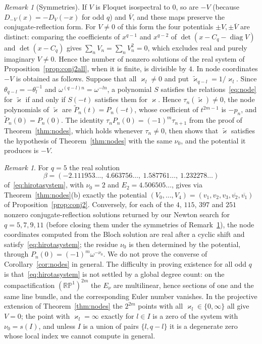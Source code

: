 \documentclass[11pt,reqno]{amsart}
\theoremstyle{definition}
\theoremstyle{remark}
\newtheorem{remark}[theorem]{Remark}
\newcommand{\R}{\mathbb R}
\DeclareMathOperator{\diag}{diag}
\begin{document}
\begin{remark}[Symmetries]\label{rem:nodesym}
If $V$ is Floquet isospectral to $0$, so are $-V$ (because
$D_{-V}(x)=-D_V(-x)$ for odd $q$) and $\overline V$, and these maps preserve the
conjugate-reflection form.  For $V\ne0$ of this form the four potentials
$\pm V,\pm\overline V$ are distinct: comparing the coefficients of $x^{q-1}$ and
$x^{q-2}$ of $\det(x-C_q-\diag V)$ and $\det(x-C_q)$ gives
$\sum_nV_n=\sum_nV_n^2=0$, which excludes real and purely imaginary $V\ne0$.
Hence the number of nonzero solutions of the real system of
Proposition~\ref{prop:conj2all}, when it is finite, is divisible by $4$.  In
node coordinates $-V$ is obtained as follows.  Suppose that all
$\varkappa_l\ne0$ and put $\tilde\varkappa_{q-l}=1/\varkappa_l$.  Since
$\theta_{q-l}=-\theta_l^{-1}$ and $\omega^{(q-l)n}=\omega^{-ln}$, a polynomial
$S$ satisfies the relations~\eqref{eq:node} for $\tilde\varkappa$ if and only
if $S(-t)$ satisfies them for $\varkappa$.  Hence $\tau_n(\tilde\varkappa)\ne0$,
the node polynomials of $\tilde\varkappa$ are $\tilde P_n(t)=P_n(-t)$, whose
coefficient of $t^{2m-1}$ is $-p_n$, and $\tilde P_n(0)=P_n(0)$.  The identity
$\tau_nP_n(0)=(-1)^m\tau_{n+1}$ from the proof of Theorem~\ref{thm:nodes}, which
holds whenever $\tau_n\ne0$, then shows that $\tilde\varkappa$ satisfies the
hypothesis of Theorem~\ref{thm:nodes} with the same $\nu_0$, and the potential
it produces is $-V$.
\end{remark}

\begin{remark}\label{rem:nodesnum}
For $q=5$ the real solution
\[
 \beta=(-2.111953\ldots,\ 4.663756\ldots,\ 1.587761\ldots,\ 1.232278\ldots)
\]
of~\eqref{eq:hirotasystem}, with $\nu_0=2$ and $E_2=4.506505\ldots$, gives
via Theorem~\ref{thm:nodes}(b) exactly the potential
$(V_0,\dots,V_4)=(v_1,v_2,v_3,\overline{v_2},\overline{v_1})$ of
Proposition~\ref{prop:conj2}.  Conversely, for each of the $4$, $115$, $397$
and $251$ nonzero conjugate-reflection solutions returned by our Newton search
for $q=5,7,9,11$ (before closing them under the symmetries of
Remark~\ref{rem:nodesym}), the node coordinates computed from the Bloch
solution are real after a cyclic shift and satisfy~\eqref{eq:hirotasystem};
the residue $\nu_0$ is then determined by the potential, through
$P_n(0)=(-1)^m\omega^{-\nu_0}$.  We do not prove the converse of
Corollary~\ref{cor:nodes} in general.  The difficulty in proving existence for
all odd $q$ is that~\eqref{eq:hirotasystem} is not settled by a global degree
count: on the compactification $(\R\mathbb P^1)^{2m}$ the $E_\nu$ are
multilinear, hence sections of one and the same line bundle, and the
corresponding Euler number vanishes.  In the projective extension of
Theorem~\ref{thm:nodes} the $2^{2m}$ points with all $\varkappa_l\in\{0,\infty\}$ all
give $V=0$; the point with $\varkappa_l=\infty$ exactly for $l\in I$ is a zero of
the system with $\nu_0=s(I)$, and unless $I$ is a union of pairs
$\{l,q-l\}$ it is a degenerate zero whose local index we cannot compute in
general.
\end{remark}
\end{document}
